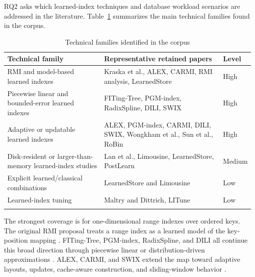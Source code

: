 \documentclass[a4paper, 12pt, twoside]{report}
\begin{document}
RQ2 asks which learned-index techniques and database workload scenarios are addressed in the literature. Table~\ref{tab:technical-map} summarizes the main technical families found in the corpus.

\begin{longtable}{|p{3.1cm}|p{7.7cm}|p{1.8cm}|}
\hline
\textbf{Technical family} & \textbf{Representative retained papers} & \textbf{Level} \\
\hline
RMI and model-based learned indexes & Kraska et al., ALEX, CARMI, RMI analysis, LearnedStore \cite{kraska2018,ding2020alex,zhang2022carmi,maltry2022critical,maharjan2023learnedstore} & High \\
\hline
Piecewise linear and bounded-error learned indexes & FITing-Tree, PGM-index, RadixSpline, DILI, SWIX \cite{galakatos2019fiting,ferragina2020pgm,kipf2020radixspline,li2023dili,liang2024swix} & High \\
\hline
Adaptive or updatable learned indexes & ALEX, PGM-index, CARMI, DILI, SWIX, Wongkham et al., Sun et al., RoBin \cite{ding2020alex,ferragina2020pgm,zhang2022carmi,li2023dili,liang2024swix,wongkham2022ready,sun2023learned,luo2025robustness} & High \\
\hline
Disk-resident or larger-than-memory learned-index studies & Lan et al., Limousine, LearnedStore, PostLearn \cite{lan2023disk,chatterjee2024limousine,maharjan2023learnedstore,fuad2026postlearn} & Medium \\
\hline
Explicit learned/classical combinations & LearnedStore and Limousine \cite{maharjan2023learnedstore,chatterjee2024limousine} & Low \\
\hline
Learned-index tuning & Maltry and Dittrich, LITune \cite{maltry2022critical,wang2025tuning} & Low \\
\hline
\caption{Technical families identified in the corpus}
\label{tab:technical-map}
\end{longtable}

The strongest coverage is for one-dimensional range indexes over ordered keys. The original RMI proposal treats a range index as a learned model of the key-position mapping \cite{kraska2018}. FITing-Tree, PGM-index, RadixSpline, and DILI all continue this broad direction through piecewise linear or distribution-driven approximations \cite{galakatos2019fiting,ferragina2020pgm,kipf2020radixspline,li2023dili}. ALEX, CARMI, and SWIX extend the map toward adaptive layouts, updates, cache-aware construction, and sliding-window behavior \cite{ding2020alex,zhang2022carmi,liang2024swix}.
\end{document}
